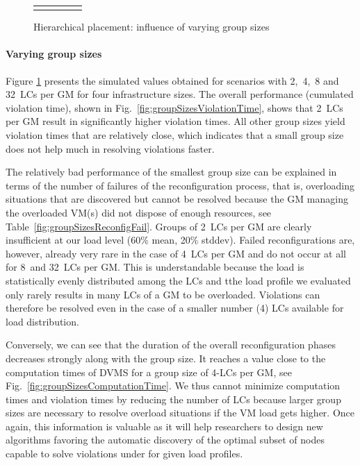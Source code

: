 \begin{figure}
\begin{minipage}{.66\textwidth}
{{\begin{tabular}[b]{|r@{\:}||@{\:}c@{\:}|@{\:}c@{\:}|@{\:}c@{\:}|@{\:}c@{\:}|}
      \Rstrut  \\ \hline
      \thickhline
  \end{tabular} }
  \label{fig:groupSizesComputationTime}
  }
\end{minipage}
\caption{Hierarchical placement: influence of varying group sizes}
\label{fig:snoozeGroupSizes}
\end{figure}

\paragraph{Varying group sizes}

Figure \ref{fig:snoozeGroupSizes} presents the simulated values
obtained for scenarios with 2,~4,~8 and 32~LCs per GM for four
infrastructure sizes. The overall performance (\ie cumulated violation
time), shown in Fig.~\ref{fig:groupSizesViolationTime}, shows that
2~LCs per GM result in significantly higher violation times. All other
group sizes yield violation times that are relatively close, which
indicates that a small group size does not help much in
resolving violations faster.

The relatively bad performance of the smallest group size can be
explained in terms of the number of failures of the reconfiguration
process, that is, overloading situations that are discovered but
cannot be resolved because the GM managing the overloaded VM(s) did
not dispose of enough resources, see
Table~\ref{fig:groupSizesReconfigFail}. Groups of 2~LCs per GM are
clearly insufficient at our load level (60\% mean, 20\% stddev).
Failed reconfigurations are, however, already very rare in the case of
4~LCs per GM and do not occur at all for 8~and 32~LCs per GM. This is
understandable because the load is statistically evenly distributed
among the LCs and tthe load profile we evaluated only rarely results
in many LCs of a GM to be overloaded. Violations can therefore be
resolved even in the case of a smaller number (4) LCs available for
load distribution.

Conversely, we can see that the duration of the overall
reconfiguration phases decreases strongly along with the group
size. It reaches a value close to the computation times of DVMS for a
group size of 4-LCs per GM, see Fig.~\ref{fig:groupSizesComputationTime}.
We thus cannot minimize computation times and violation times by
reducing the number of LCs because larger group sizes are necessary to
resolve overload situations if the VM load gets higher.  Once again,
this information is valuable as it will help researchers to design new
algorithms favoring the automatic discovery of the optimal subset of
nodes capable to solve violations under for given load profiles. 

